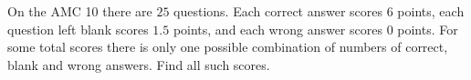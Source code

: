 On the AMC 10 there are $25$ questions. Each correct answer scores $6$ points, each question left blank scores $1.5$ points, and each wrong answer scores $0$ points. For some total scores there is only one possible combination of numbers of correct, blank and wrong answers. Find all such scores.
